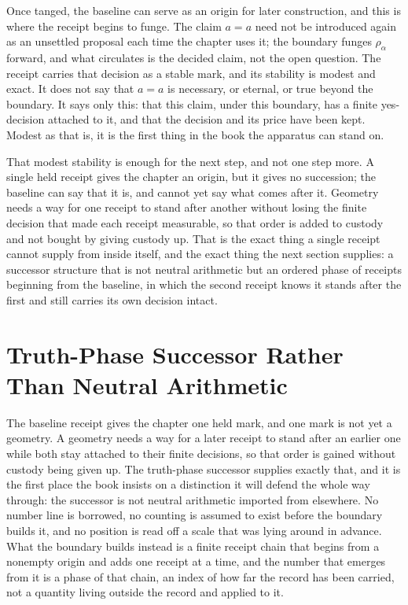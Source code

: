 Once tanged, the baseline can serve as an origin for later construction, and this is where the receipt begins to funge. The claim \(a=a\) need not be introduced again as an unsettled proposal each time the chapter uses it; the boundary funges \(\rho_\alpha\) forward, and what circulates is the decided claim, not the open question. The receipt carries that decision as a stable mark, and its stability is modest and exact. It does not say that \(a=a\) is necessary, or eternal, or true beyond the boundary. It says only this: that this claim, under this boundary, has a finite yes-decision attached to it, and that the decision and its price have been kept. Modest as that is, it is the first thing in the book the apparatus can stand on.

That modest stability is enough for the next step, and not one step more. A single held receipt gives the chapter an origin, but it gives no succession; the baseline can say that it is, and cannot yet say what comes after it. Geometry needs a way for one receipt to stand after another without losing the finite decision that made each receipt measurable, so that order is added to custody and not bought by giving custody up. That is the exact thing a single receipt cannot supply from inside itself, and the exact thing the next section supplies: a successor structure that is not neutral arithmetic but an ordered phase of receipts beginning from the baseline, in which the second receipt knows it stands after the first and still carries its own decision intact.


\section{Truth-Phase Successor Rather Than Neutral Arithmetic}

The baseline receipt gives the chapter one held mark, and one mark is not yet a geometry. A geometry needs a way for a later receipt to stand after an earlier one while both stay attached to their finite decisions, so that order is gained without custody being given up. The truth-phase successor supplies exactly that, and it is the first place the book insists on a distinction it will defend the whole way through: the successor is not neutral arithmetic imported from elsewhere. No number line is borrowed, no counting is assumed to exist before the boundary builds it, and no position is read off a scale that was lying around in advance. What the boundary builds instead is a finite receipt chain that begins from a nonempty origin and adds one receipt at a time, and the number that emerges from it is a phase of that chain, an index of how far the record has been carried, not a quantity living outside the record and applied to it.

